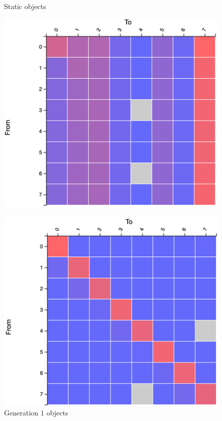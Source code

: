\documentclass{paper}\usepackage{graphicx}
\begin{document}
\begin{figure}[!htb]
    \centering
    \begin{multicols}{3}
    \caption{Static objects}
    \label{fig:dncc_static}
    \includegraphics[width=\linewidth]{Paper/images/sumeuler/divconq_static.png}\par
    \caption{Generation 1 objects}
    \label{fig:dnc_gen1}
    \includegraphics[width=\linewidth]{Paper/images/sumeuler/divconq_gen1.png}\par

\end{multicols}
\end{figure}
\end{document}
